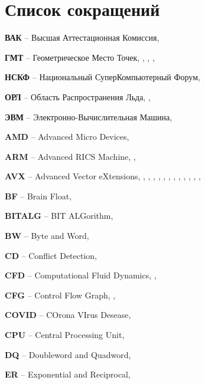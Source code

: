 \newpage

\section*{Список сокращений}

\textbf{ВАК} -- Высшая Аттестационная Комиссия, \pageref{abbr:vak-1}

\textbf{ГМТ} -- Геометрическое Место Точек, \pageref{abbr:gmt-1}, \pageref{abbr:gmt-2}, \pageref{abbr:gmt-3}, \pageref{abbr:gmt-4}

\textbf{НСКФ} -- Национальный СуперКомпьютерный Форум, \pageref{abbr:nscf-1}

\textbf{ОРЛ} -- Область Распространения Льда, \pageref{abbr:orl-1}, \pageref{abbr:orl-2}

\textbf{ЭВМ} -- Электронно-Вычислительная Машина, \pageref{abbr:evm-1}

\textbf{AMD} -- Advanced Micro Devices, \pageref{abbr:amd-1}

\textbf{ARM} -- Advanced RICS\label{abbr:risc-1} Machine, \pageref{abbr:arm-1}, \pageref{abbr:arm-2}

\textbf{AVX} -- Advanced Vector eXtensions, \pageref{abbr:avx-1}, \pageref{abbr:avx-2}, \pageref{abbr:avx-3}, \pageref{abbr:avx-4}, \pageref{abbr:avx-5}, \pageref{abbr:avx-6}, \pageref{abbr:avx-7}, \pageref{abbr:avx-8}, \pageref{abbr:avx-9}, \pageref{abbr:avx-10}, \pageref{abbr:avx-11}, \pageref{abbr:avx-12}, \pageref{abbr:avx-13}

\textbf{BF} -- Brain Float, \pageref{abbr:bf-1}

\textbf{BITALG} -- BIT ALGorithm, \pageref{abbr:bitalg-1}

\textbf{BW} -- Byte and Word, \pageref{abbr:bw-1}

\textbf{CD} -- Conflict Detection, \pageref{abbr:cd-1}

\textbf{CFD} -- Computational Fluid Dynamics, \pageref{abbr:cfd-1}, \pageref{abbr:cfd-2}

\textbf{CFG} -- Control Flow Graph, \pageref{abbr:cfg-1}, \pageref{abbr:cfg-2}

\textbf{COVID} -- COrona VIrus Desease, \pageref{abbr:covid-1}

\textbf{CPU} -- Central Processing Unit, \pageref{abbr:cpu-1}

\textbf{DQ} -- Doubleword and Quadword, \pageref{abbr:dq-1}

\textbf{ER} -- Exponential and Reciprocal, \pageref{abbr:er-1}

